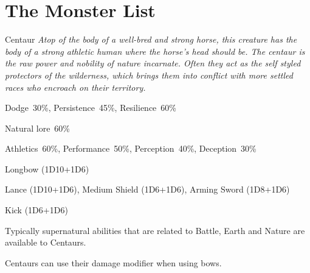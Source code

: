 \clearpage

\section{The Monster List}

\begin{monsterbox}{Centaur}
	\textit{Atop of the body of a well-bred and strong horse, this creature has the body of a strong athletic human where the horse’s head should be. The centaur is the raw power and nobility of nature incarnate. Often they act as the self styled protectors of the wilderness, which brings them into conflict with more settled races who encroach on their territory.}\\
	\rpghline
	\basics[%
        hitpoints  = 19, %
	majorwound = 10,
	damagemodifier = +1D6,
	powerpoints = 11,
	movementrate = 23m,
	armor = Leather (2AP),
	plunderrating = 2
	]
	\rpghline%
	\stats[ %
		STR = 3D6+6 (17),
		CON = 3D6   (11),
		DEX = 3D6+3 (14),
		SIZ = 4D6+12 (26),
		INT = 2D6+6 (13),
		POW = 3D6   (11),
		CHA = 3D6   (11)
	]
	\rpghline%
	\begin{rpg-monsteraction}[Resistances]
		Dodge~30\%, Persistence~45\%, Resilience~60\%
	\end{rpg-monsteraction}
	\begin{rpg-monsteraction}[Knowledge]
    		Natural lore~60\%
	\end{rpg-monsteraction}
	\begin{rpg-monsteraction}[Practical]
		Athletics~60\%, Performance~50\%, Perception~40\%, Deception~30\%
	\end{rpg-monsteraction}
	\begin{rpg-monsteraction}
		Longbow (1D10+1D6)
	\end{rpg-monsteraction}
	\begin{rpg-monsteraction}
		Lance (1D10+1D6), Medium Shield (1D6+1D6), Arming Sword (1D8+1D6)
	\end{rpg-monsteraction}
	\begin{rpg-monsteraction}
		Kick (1D6+1D6)
	\end{rpg-monsteraction}
	\begin{rpg-monsteraction}[Supernatural]
		Typically supernatural abilities that are related to Battle, Earth and Nature are available to Centaurs.
	\end{rpg-monsteraction}
	\begin{rpg-monsteraction}
		Centaurs can use their damage modifier when using bows.
	\end{rpg-monsteraction}

\end{monsterbox}

